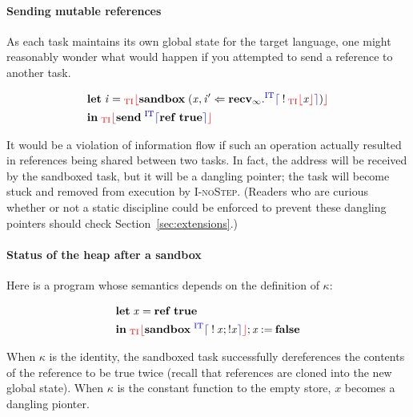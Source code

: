 \documentclass{sigplanconf}
\newcommand{\Varid}[1]{\mathit{#1}}
\begin{document}
\paragraph{Sending mutable references}  As each task maintains its own
global state for the target language, one might reasonably wonder what would
happen if you attempted to send a reference to another task.

\begin{align*}
    & \ensuremath{\mathbf{let}\;\Varid{i}\mathrel{=}\tar{_{\textrm{TI}}\lfloor}\mathbf{sandbox}\;(\Varid{x},\Varid{i'}\Leftarrow\mathbf{recv}_{\infty}.\ifc{^{\textrm{IT}}\lceil}\mathbin{!}\tar{_{\textrm{TI}}\lfloor}\Varid{x}\tar{\rfloor}\ifc{\rceil})\tar{\rfloor}} \\
    & \ensuremath{\mathbf{in}\;\tar{_{\textrm{TI}}\lfloor}\mathbf{send}\;\ifc{^{\textrm{IT}}\lceil}\mathbf{ref}\;\mathbf{true}\ifc{\rceil}\tar{\rfloor}}
\end{align*}

It would be a violation of information flow if such an operation actually
resulted in references being shared between two tasks.  In fact, the address
will be received by the sandboxed task, but it will be a dangling pointer; the
task will become stuck and removed from execution by \textsc{I-noStep}.  (Readers
who are curious whether or not a static discipline could be enforced to
prevent these dangling pointers should check Section~\ref{sec:extensions}.)

\paragraph{Status of the heap after a sandbox}  Here is a program whose
semantics depends on the definition of $\kappa$:

\begin{align*}
    & \ensuremath{\mathbf{let}\;\Varid{x}\mathrel{=}\mathbf{ref}\;\mathbf{true}} \\
    & \ensuremath{\mathbf{in}\;\tar{_{\textrm{TI}}\lfloor}\mathbf{sandbox}\;\ifc{^{\textrm{IT}}\lceil}\mathbin{!}\Varid{x};\mathbin{!}\Varid{x}\ifc{\rceil}\tar{\rfloor};\Varid{x}\mathbin{:=}\mathbf{false}}
\end{align*}

When $\kappa$ is the identity, the sandboxed task successfully dereferences
the contents of the reference to be true twice (recall that references
are cloned into the new global state).  When $\kappa$ is the constant function
to the empty store, $x$ becomes a dangling pionter.
\end{document}
